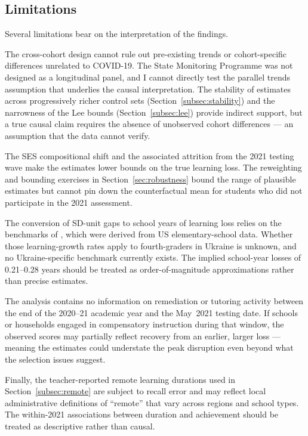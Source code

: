 \subsection*{Limitations}

Several limitations bear on the interpretation of the findings.

The cross-cohort design cannot rule out pre-existing trends or
cohort-specific differences unrelated to COVID-19. The State Monitoring
Programme was not designed as a longitudinal panel, and I cannot
directly test the parallel trends assumption that underlies the
causal interpretation. The stability of estimates across progressively
richer control sets (Section~\ref{subsec:stability}) and the narrowness
of the Lee bounds (Section~\ref{subsec:lee}) provide indirect support,
but a true causal claim requires the absence of unobserved cohort
differences --- an assumption that the data cannot verify.

The SES compositional shift and the associated attrition from the 2021
testing wave make the estimates lower bounds on the true learning loss.
The reweighting and bounding exercises in Section~\ref{sec:robustness}
bound the range of plausible estimates but cannot pin down the
counterfactual mean for students who did not participate in the 2021
assessment.

The conversion of SD-unit gaps to school years of learning loss relies
on the benchmarks of \citet{hill2008empirical}, which were derived from
US elementary-school data. Whether those learning-growth rates apply to
fourth-graders in Ukraine is unknown, and no Ukraine-specific benchmark
currently exists. The implied school-year losses of 0.21--0.28 years
should be treated as order-of-magnitude approximations rather than
precise estimates.

The analysis contains no information on remediation or tutoring activity
between the end of the 2020--21 academic year and the May~2021 testing
date. If schools or households engaged in compensatory instruction during
that window, the observed scores may partially reflect recovery from an
earlier, larger loss --- meaning the estimates could understate the peak
disruption even beyond what the selection issues suggest.

Finally, the teacher-reported remote learning durations used in
Section~\ref{subsec:remote} are subject to recall error and may reflect
local administrative definitions of ``remote'' that vary across regions
and school types. The within-2021 associations between duration and
achievement should be treated as descriptive rather than causal.

